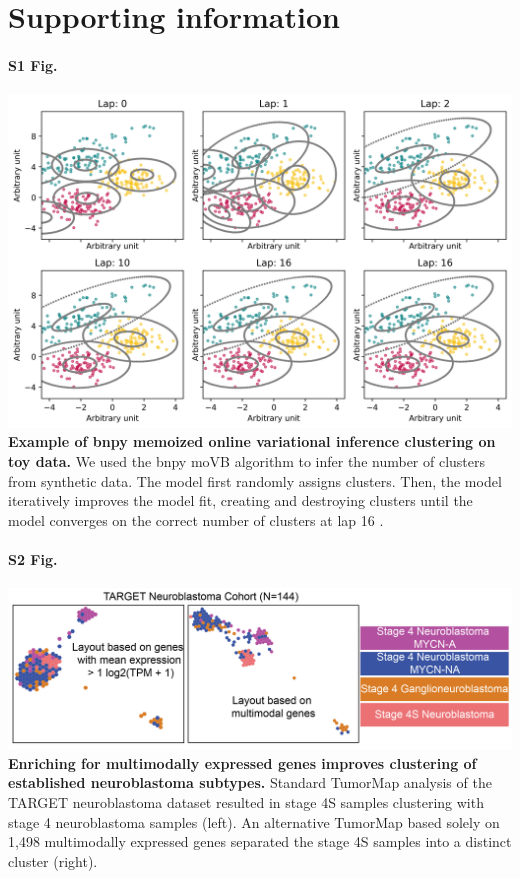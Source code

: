 \documentclass[10pt,letterpaper]{article}
\begin{document}
\section*{Supporting information}

\paragraph*{S1 Fig.}
\includegraphics[width=\textwidth]{img/PNG/cluster-over-time}
\label{S1_Fig}
{\bf Example of bnpy memoized online variational inference clustering on toy data.} We used the bnpy moVB algorithm to infer the number of clusters from synthetic data. The model first randomly assigns clusters. Then, the model iteratively improves the model fit, creating and destroying clusters until the model converges on the correct number of clusters at lap 16 \cite{hughesBnpyReliableScalable}.

\paragraph*{S2 Fig.}
\includegraphics[width=\textwidth]{img/PNG/TumorMap-NBL-MM-V2-2x}
\label{S2_Fig}
{\bf Enriching for multimodally expressed genes improves clustering of established neuroblastoma subtypes.} Standard TumorMap analysis of the TARGET neuroblastoma dataset resulted in stage 4S samples clustering with stage 4 neuroblastoma samples (left). An alternative TumorMap based solely on 1,498 multimodally expressed genes separated the stage 4S samples into a distinct cluster (right).
\end{document}
